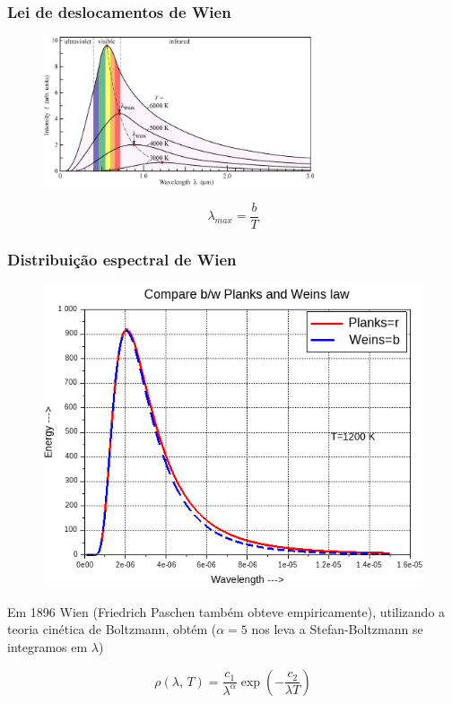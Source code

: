 \documentclass[12pt,brazil]{beamer}
\begin{document}

\begin{frame}
  \frametitle{Lei de deslocamentos de Wien}
  
        \begin{figure}
          \includegraphics[width=8cm]{figuras/fig06}
        \end{figure}
        
        \[
          \lambda_{max} = \dfrac{b}{T}
        \]
  
\end{frame}



\begin{frame}
  \frametitle{Distribuição espectral de Wien}
  
        \begin{figure}
          \includegraphics[width=6.cm]{figuras/fig07}
        \end{figure}
        \fontsize{10pt}{11pt}\selectfont
        
        Em 1896 Wien (Friedrich Paschen também obteve empiricamente), utilizando a teoria cinética de Boltzmann, obtém ($\alpha = 5$ nos leva a Stefan-Boltzmann se integramos em $\lambda$)
        
        \[
          \rho (\lambda, \, T)= \dfrac{c_1}{\lambda^\alpha}\exp\left(-\dfrac{c_2}{\lambda T}\right)
        \]
  
\end{frame}
\end{document}
